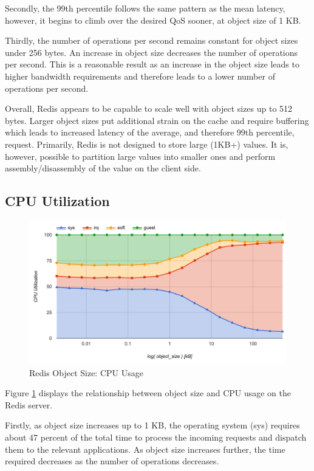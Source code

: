 Secondly, the 99th percentile follows the same pattern as the mean latency, however, it begins to climb over the desired QoS sooner, at object size of 1 KB.

Thirdly, the number of operations per second remains constant for object sizes under 256 bytes. An increase in object size decreases the number of operations per second. This is a reasonable result as an increase in the object size leads to higher bandwidth requirements and therefore leads to a lower number of operations per second.

Overall, Redis appears to be capable to scale well with object sizes up to 512 bytes. Larger object sizes put additional strain on the cache and require buffering which leads to increased latency of the average, and therefore 99th percentile, request. Primarily, Redis is not designed to store large (1KB+) values. It is, however, possible to partition large values into smaller ones and perform assembly/disassembly of the value on the client side.

\subsection{CPU Utilization}
\begin{figure}[h]
    \includegraphics[width=\textwidth]{./res/6_object_size_cpu.png}
    \caption{Redis Object Size: CPU Usage}
    \label{fig:6_object_size_cpu.png}
\end{figure}

Figure \ref{fig:6_object_size_cpu.png} displays the relationship between object size and CPU usage on the Redis server.

Firstly, as object size increases up to 1 KB, the operating system (sys) requires about 47 percent of the total time to process the incoming requests and dispatch them to the relevant applications. As object size increases further, the time required decreases as the number of operations decreases.

